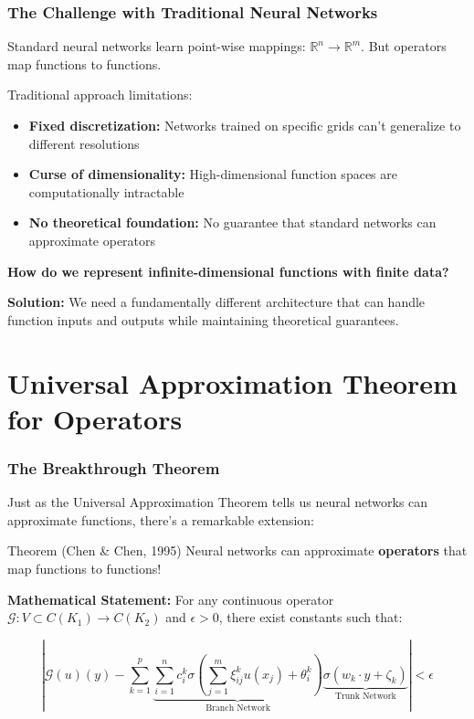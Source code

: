 \documentclass[notes]{beamer}
\begin{document}
\begin{frame}
\frametitle{The Challenge with Traditional Neural Networks}

Standard neural networks learn point-wise mappings: $\mathbb{R}^n \rightarrow \mathbb{R}^m$. But operators map functions to functions.

\begin{alertblock}{Traditional approach limitations:}
\begin{itemize}
    \item \textbf{Fixed discretization:} Networks trained on specific grids can't generalize to different resolutions
    \item \textbf{Curse of dimensionality:} High-dimensional function spaces are computationally intractable
    \item \textbf{No theoretical foundation:} No guarantee that standard networks can approximate operators
\end{itemize}
\end{alertblock}

\textbf{How do we represent infinite-dimensional functions with finite data?}

\vspace{0.5cm}

\textbf{Solution:} We need a fundamentally different architecture that can handle function inputs and outputs while maintaining theoretical guarantees.

\end{frame}

\section{Universal Approximation Theorem for Operators}

\begin{frame}
\frametitle{The Breakthrough Theorem}

Just as the Universal Approximation Theorem tells us neural networks can approximate functions, there's a remarkable extension:

\begin{block}{Theorem (Chen \& Chen, 1995)}
Neural networks can approximate \textbf{operators} that map functions to functions!
\end{block}

\textbf{Mathematical Statement:} For any continuous operator $\mathcal{G}: V \subset C(K_1) \rightarrow C(K_2)$ and $\epsilon > 0$, there exist constants such that:

\begin{equation*}
\left|\mathcal{G}(u)(y) - \sum_{k=1}^p \underbrace{\sum_{i=1}^n c_i^k \sigma\left(\sum_{j=1}^m \xi_{ij}^k u(x_j) + \theta_i^k\right)}_{\text{Branch Network}} \underbrace{\sigma(w_k \cdot y + \zeta_k)}_{\text{Trunk Network}}\right| < \epsilon
\end{equation*}

\end{frame}
\end{document}
